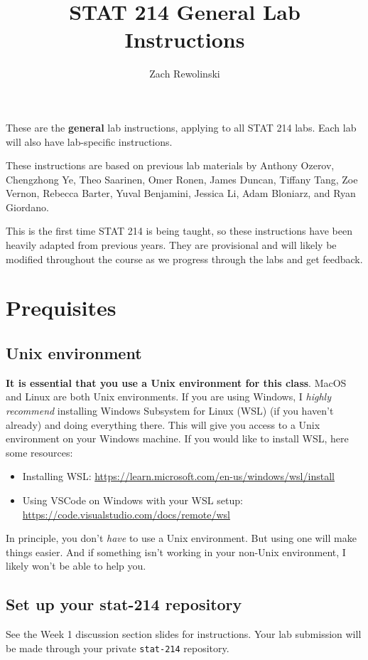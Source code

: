 \documentclass[letterpaper,12pt]{article}
\title{STAT 214 General Lab Instructions\vspace{-1em}}
\author{Zach Rewolinski}
\begin{document}
\maketitle

These are the \textbf{general} lab instructions, applying to all STAT 214 labs. Each lab will also have lab-specific instructions.

\tableofcontents

These instructions are based on previous lab materials by Anthony Ozerov, Chengzhong Ye, Theo Saarinen, Omer Ronen, James Duncan, Tiffany Tang, Zoe Vernon, Rebecca Barter, Yuval Benjamini, Jessica Li, Adam Bloniarz, and Ryan Giordano.

This is the first time STAT 214 is being taught, so these instructions have been heavily adapted from previous years. They are provisional and will likely be modified throughout the course as we progress through the labs and get feedback.

\section{Prequisites}
\subsection{Unix environment}
\textbf{It is essential that you use a Unix environment for this class}. MacOS and Linux are both Unix environments. If you are using Windows, I \textit{highly recommend} installing Windows Subsystem for Linux (WSL) (if you haven't already) and doing everything there. This will give you access to a Unix environment on your Windows machine. If you would like to install WSL, here some resources:
\begin{itemize}
    \item Installing WSL: \url{https://learn.microsoft.com/en-us/windows/wsl/install}
    \item Using VSCode on Windows with your WSL setup: \url{https://code.visualstudio.com/docs/remote/wsl}
\end{itemize}
In principle, you don't \textit{have} to use a Unix environment. But using one will make things easier. And if something isn't working in your non-Unix environment, I likely won't be able to help you.
\subsection{Set up your stat-214 repository}
See the Week 1 discussion section slides for instructions. Your lab submission will be made through your private \texttt{stat-214} repository.
\end{document}
